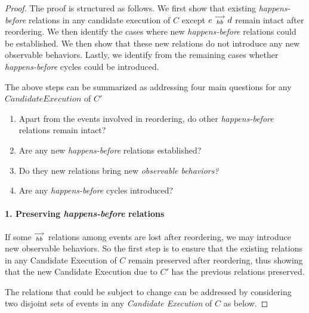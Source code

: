 \begin{proof}

    The proof is structured as follows. We first show that existing \textit{happens-before} relations in any candidate execution of $C$ except $e\stackrel{\longrightarrow}{_{hb}}d$ remain intact after reordering. We then identify the cases where new \textit{happens-before} relations could be established. We then show that these new relations do not introduce any new observable behaviors. Lastly, we identify from the remaining cases whether \textit{happens-before} cycles could be introduced.
    
    The above steps can be summarized as addressing four main questions for any $Candidate Execution$ of $C'$
    \begin{enumerate}
        \item Apart from the events involved in reordering, do other \emph{happens-before} relations remain intact?
        \item Are any new \emph{happens-before} relations established? 
        \item Do they new relations bring new \emph{observable behaviors?}
        \item Are any \emph{happens-before} cycles introduced? 
    \end{enumerate}
    
    
    \paragraph{1. Preserving \textit{happens-before} relations}
        
        If some $\stackrel{\longrightarrow}{_{hb}}$ relations among events are lost after reordering, we may introduce new observable behaviors. So the first step is to ensure that the existing relations in any Candidate Execution of $C$ remain preserved after reordering, thus showing that the new Candidate Execution due to $C'$ has the previous relations preserved. 
        
        
        The relations that could be subject to change can be addressed by considering two disjoint sets of events in any \textit{Candidate Execution} of $C$ as below.
        

\end{proof}
